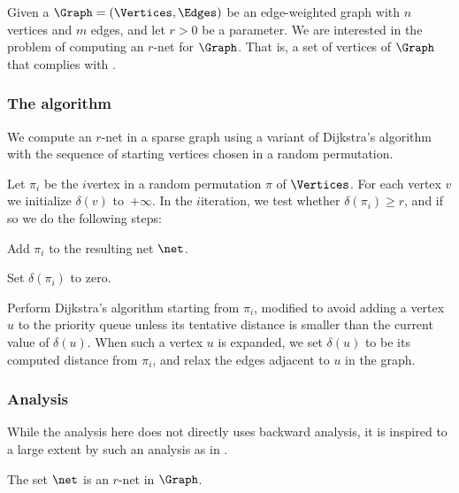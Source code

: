 Given a $\Graph = (\Vertices, \Edges)$ be an edge-weighted graph with
$n$ vertices and $m$ edges, and let $r >0$ be a parameter. We are
interested in the problem of computing an $r$-net for $\Graph$. That
is, a set of vertices of $\Graph$ that complies with .

\subsubsection{The algorithm}
We compute an $r$-net in a sparse graph using a variant of Dijkstra's
algorithm with the sequence of starting vertices chosen in a random
permutation.

Let $\pi_i$ be the $i$\th vertex in a random permutation $\pi$ of
$\Vertices$. For each vertex $v$ we initialize $\delta(v)$
to~$+\infty$. In the $i$\th iteration, we test whether
$\delta(\pi_i) \geq r$, and if so we do the following steps:
\smallskip
\begin{compactenumA}
    \item Add $\pi_i$ to the resulting net $\net$.
    \item Set $\delta(\pi_i)$ to zero.
    \item Perform Dijkstra's algorithm starting from $\pi_i$, modified
    to avoid adding a vertex $u$ to the priority queue unless its
    tentative distance is smaller than the current value of
    $\delta(u)$. When such a vertex $u$ is expanded, we set
    $\delta(u)$ to be its computed distance from $\pi_i$, and relax
    the edges adjacent to $u$ in the graph.
\end{compactenumA}




\subsubsection{Analysis}

While the analysis here does not directly uses backward analysis, it
is inspired to a large extent by such an analysis as in
.





\begin{lemma}
    The set $\net$ is an $r$-net in $\Graph$.
\end{lemma}

